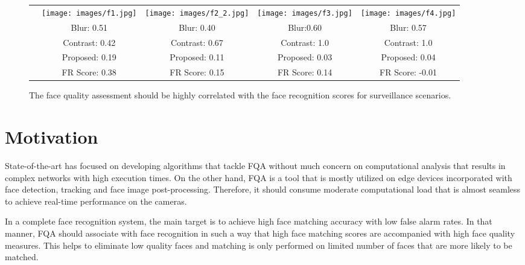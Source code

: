\documentclass[runningheads]{llncs}
\begin{document}
\begin{figure*}[t]
\setlength\tabcolsep{1pt}\begin{tabularx}{\textwidth}{@{}c*{4}{C}@{}}
 &
   \texttt{[image: images/f1.jpg]} &
   \texttt{[image: images/f2\_2.jpg]}
   &
   \texttt{[image: images/f3.jpg]} &
   \texttt{[image: images/f4.jpg]}
   \\
& Blur\cite{Lienhard-2015}: 0.51 & Blur\cite{Lienhard-2015}: 0.40 & 
   Blur\cite{Lienhard-2015}:0.60 & Blur\cite{Lienhard-2015}: 0.57
   \\
   & Contrast\cite{Lienhard-2015}: 0.42 & Contrast\cite{Lienhard-2015}: 0.67 & Contrast\cite{Lienhard-2015}: 1.0 & Contrast\cite{Lienhard-2015}: 1.0
   \\
   & Proposed: 0.19 & Proposed: 0.11 & Proposed: 0.03 & Proposed: 0.04
   \\
   & FR Score: 0.38 & FR Score: 0.15 & FR Score: 0.14 & FR Score: -0.01
   \\
\end{tabularx}
\caption{The face quality assessment should be highly correlated with the face recognition scores for surveillance scenarios. } \label{fig:occlusion}
\end{figure*}

\section{Motivation}
State-of-the-art has focused on developing algorithms that tackle FQA without much concern on computational analysis that results in complex networks with high execution times. On the other hand, FQA is a tool that is mostly utilized on edge devices incorporated with face detection, tracking and face image post-processing. Therefore, it should consume moderate computational load that is almost seamless to achieve real-time performance on the cameras.

In a complete face recognition system, the main target is to achieve high face matching accuracy with low false alarm rates. In that manner, FQA should associate with face recognition in such a way that high face matching scores are accompanied with high face quality measures. This helps to eliminate low quality faces and matching is only performed on limited number of faces that are more likely to be matched.
\end{document}

